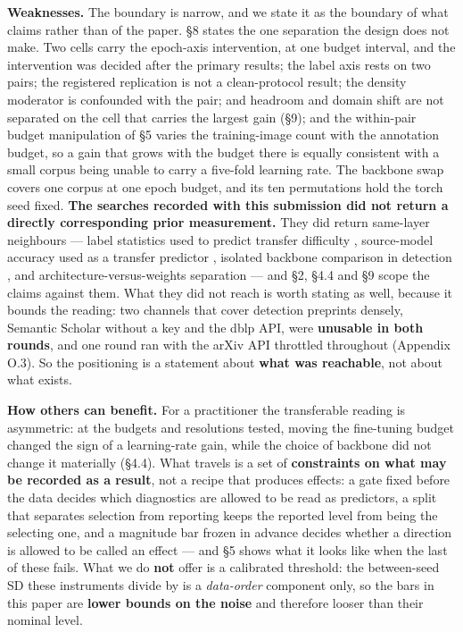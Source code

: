 \documentclass[pdflatex,sn-mathphys-ay]{sn-jnl}
\begin{document}
\textbf{Weaknesses.} The boundary is narrow, and we state it as the boundary of what claims rather than of the paper. \S{}8 states the one separation the design does not make. Two cells carry the epoch-axis intervention, at one budget interval, and the intervention was decided after the primary results; the label axis rests on two pairs; the registered replication is not a clean-protocol result; the density moderator is confounded with the pair; and headroom and domain shift are not separated on the cell that carries the largest gain (\S{}9); and the within-pair budget manipulation of \S{}5 varies the training-image count with the annotation budget, so a gain that grows with the budget there is equally consistent with a small corpus being unable to carry a five-fold learning rate. The backbone swap covers one corpus at one epoch budget, and its ten permutations hold the torch seed fixed. \textbf{The searches recorded with this submission did not return a directly corresponding prior measurement.} They did return same-layer neighbours --- label statistics used to predict transfer difficulty \citep{tran2019}, source-model accuracy used as a transfer predictor \citep{kornblith2019}, isolated backbone comparison in detection \citep{ding2023,mahadevkar2024}, and architecture-versus-weights separation \citep{ning2023} --- and \S{}2, \S{}4.4 and \S{}9 scope the claims against them. What they did not reach is worth stating as well, because it bounds the reading: two channels that cover detection preprints densely, Semantic Scholar without a key and the dblp API, were \textbf{unusable in both rounds}, and one round ran with the arXiv API throttled throughout (Appendix O.3). So the positioning is a statement about \textbf{what was reachable}, not about what exists.

\textbf{How others can benefit.} For a practitioner the transferable reading is asymmetric: at the budgets and resolutions tested, moving the fine-tuning budget changed the sign of a learning-rate gain, while the choice of backbone did not change it materially (\S{}4.4). What travels is a set of \textbf{constraints on what may be recorded as a result}, not a recipe that produces effects: a gate fixed before the data decides which diagnostics are allowed to be read as predictors, a split that separates selection from reporting keeps the reported level from being the selecting one, and a magnitude bar frozen in advance decides whether a direction is allowed to be called an effect --- and \S{}5 shows what it looks like when the last of these fails. What we do \textbf{not} offer is a calibrated threshold: the between-seed SD these instruments divide by is a \emph{data-order} component only, so the bars in this paper are \textbf{lower bounds on the noise} and therefore looser than their nominal level.
\end{document}
